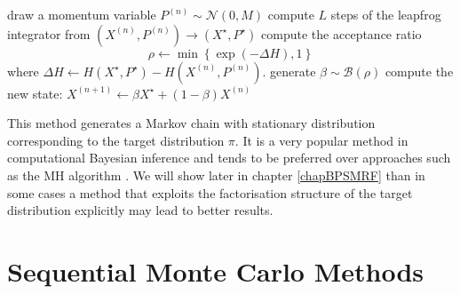 \begin{algorithm}[!h]\small
	\caption{\label{alg:hmc-alg}}
	\begin{algorithmic}[1]
		\State draw a momentum variable $P^{(n)}\sim\mathcal N(0, M) $
		\State compute $L$ steps of the leapfrog integrator from $(X^{(n)},P^{(n)})\rightarrow (X^{\star},P^{\star})$ 
		\State compute the acceptance ratio
			$$ \rho \leftarrow \min\left\{\exp\left(-\Delta H \right),1\right\} $$
			where $\Delta H \leftarrow H(X^{\star},P^{\star})-H(X^{(n)}, P^{(n)})$.
		\State generate $\beta \sim\mathcal B(\rho)$
		\State compute the new state: $X^{(n+1)} \leftarrow \beta X^{\star}+(1-\beta)X^{(n)}$
	\end{algorithmic}
\end{algorithm}

This method generates a Markov chain with stationary distribution corresponding to the target distribution $\pi$. 
It is a very popular method in computational Bayesian inference and tends to be preferred over approaches such as the MH algorithm \citep{neal11}. We will show later in chapter \ref{chapBPSMRF} than in some cases a method that exploits the factorisation structure of the target distribution explicitly may lead to better results. 

\newpage
\section{Sequential Monte Carlo Methods}

